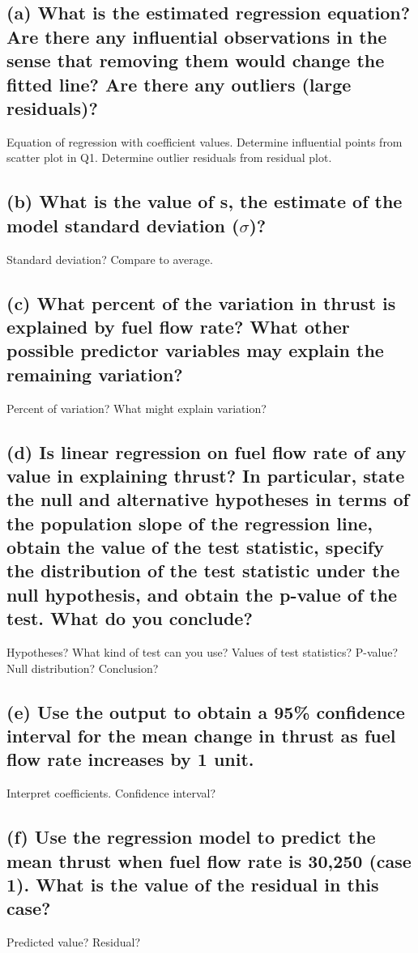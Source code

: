 \documentclass[letterpaper]{article}
\begin{document}
\subsection{(a)	What is the estimated regression equation? Are there any influential observations  in the sense that removing them would change the fitted line? Are there any outliers (large residuals)?}
Equation of regression with coefficient values. Determine
influential points from scatter plot in Q1. Determine outlier residuals from residual plot.

\subsection{(b)	What is the value of s, the estimate of the model standard deviation ($\sigma$)?}
Standard deviation? Compare to average.

\subsection{(c)	What percent of the variation in  thrust is explained by fuel flow rate? What other possible predictor variables may explain the remaining variation?}
Percent of variation? What might explain variation?

\subsection{(d)	Is linear regression on fuel flow rate of any value in explaining thrust? In particular, state the
 null and alternative hypotheses in terms of the population slope of the regression line, obtain the value of the test statistic, specify the distribution of the test statistic under the null hypothesis, and obtain the p-value of the test. What do you conclude?}
Hypotheses? What kind of test can you use? Values of test
statistics? P-value? Null distribution? Conclusion?

\subsection{(e)	Use the output to obtain a 95\% confidence interval for the mean change in thrust as fuel flow rate increases by 1 unit.}
Interpret coefficients. Confidence interval?

\subsection{(f)	Use the regression model to predict the mean thrust when fuel flow rate is 30,250 (case 1). What is the value of the residual in this case?}
Predicted value? Residual?
\end{document}
